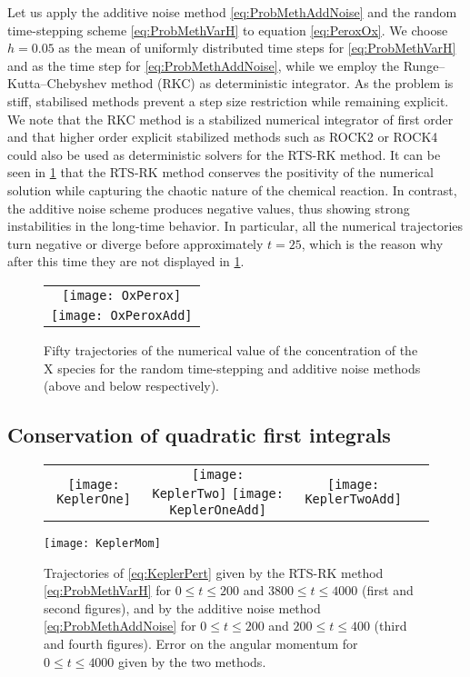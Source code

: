 \documentclass[10pt]{article}
\begin{document}
Let us apply the additive noise method \eqref{eq:ProbMethAddNoise} and the random time-stepping scheme \eqref{eq:ProbMethVarH} to equation \eqref{eq:PeroxOx}. We choose $h = 0.05$ as the mean of uniformly distributed time steps for \eqref{eq:ProbMethVarH} and as the time step for \eqref{eq:ProbMethAddNoise}, while we employ the Runge--Kutta--Chebyshev method (RKC) \cite{HoS80} as deterministic integrator. As the problem is stiff, stabilised methods prevent a step size restriction while remaining explicit. We note that the RKC method is a stabilized numerical integrator of first order and that higher order explicit stabilized methods such as ROCK2 or ROCK4 \cite{AbM01, Abd02} could also be used as deterministic solvers for the RTS-RK method. It can be seen in \cref{fig:OxPeroxTraj} that the RTS-RK method conserves the positivity of the numerical solution while capturing the chaotic nature of the chemical reaction. In contrast, the additive noise scheme produces negative values, thus showing strong instabilities in the long-time behavior. In particular, all the numerical trajectories turn negative or diverge before approximately $t = 25$, which is the reason why after this time they are not displayed in \cref{fig:OxPeroxTraj}.
\begin{figure}
	\begin{center} 
		\begin{tabular}{c}
			\texttt{[image: OxPerox]}\\
			\texttt{[image: OxPeroxAdd]}
		\end{tabular}
	\end{center}
	\caption{Fifty trajectories of the numerical value of the concentration of the $\mathrm X$ species for the random time-stepping and additive noise methods (above and below respectively).}
	\label{fig:OxPeroxTraj}
\end{figure}

\subsection{Conservation of quadratic first integrals} 

\begin{figure}[t]
	\begin{center}
		\begin{tabular}{cccc}
			\texttt{[image: KeplerOne]} & \texttt{[image: KeplerTwo]} \texttt{[image: KeplerOneAdd]} & \texttt{[image: KeplerTwoAdd]} \\
		\end{tabular}
	\texttt{[image: KeplerMom]}
	\end{center}
	\caption{Trajectories of \eqref{eq:KeplerPert} given by the RTS-RK method \eqref{eq:ProbMethVarH} for $0 \leq t \leq 200$ and $3800 \leq t \leq 4000$ (first and second figures), and by the additive noise method \eqref{eq:ProbMethAddNoise} for $0 \leq t \leq 200$ and $200 \leq t \leq 400$ (third and fourth figures). Error on the angular momentum for $0 \leq t \leq 4000$ given by the two methods.}
	\label{fig:Kepler}
\end{figure}
\end{document}
